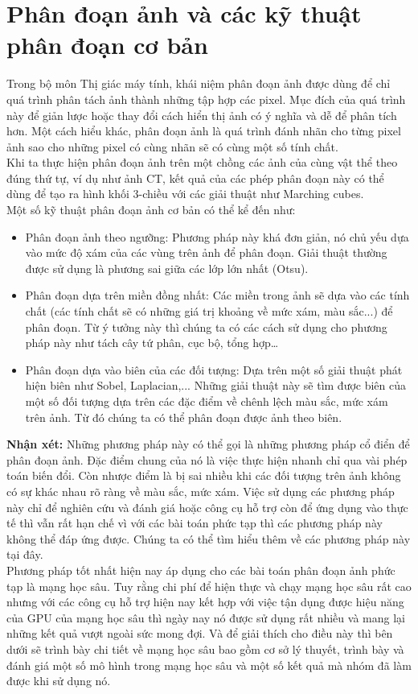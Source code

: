 \section{Phân đoạn ảnh và các kỹ thuật phân đoạn cơ bản}
Trong bộ môn Thị giác máy tính, khái niệm phân đoạn ảnh được dùng để chỉ quá trình phân tách ảnh thành những tập hợp các pixel. Mục đích của quá trình này để giản lược hoặc thay đổi cách hiển thị ảnh có ý nghĩa và dễ để phân tích hơn. Một cách hiểu khác, phân đoạn ảnh là quá trình đánh nhãn cho từng pixel ảnh sao cho những pixel có cùng nhãn sẽ có cùng một số tính chất.\\
Khi ta thực hiện phân đoạn ảnh trên một chồng các ảnh của cùng vật thể theo đúng thứ tự, ví dụ như ảnh CT, kết quả của các phép phân đoạn này có thể dùng để tạo ra hình khối 3-chiều với các giải thuật như Marching cubes.\\
Một số kỹ thuật phân đoạn ảnh cơ bản có thể kể đến như:
\begin{itemize}
\item Phân đoạn ảnh theo ngưỡng: Phương pháp này khá đơn giản, nó chủ yếu dựa vào mức độ xám của các vùng trên ảnh để phân đoạn. Giải thuật thường được sử dụng là phương sai giữa các lớp lớn nhất (Otsu).
\item Phân đoạn dựa trên miền đồng nhất: Các miền trong ảnh sẽ dựa vào các tính chất (các tính chất sẽ có những giá trị khoảng về mức xám, màu sắc...) để phân đoạn. Từ ý tưởng này thì chúng ta có các cách sử dụng cho phương pháp này như tách cây tứ phân, cục bộ, tổng hợp…
\item Phân đoạn dựa vào biên của các đối tượng: Dựa trên một số giải thuật phát hiện biên như Sobel, Laplacian,... Những giải thuật này sẽ tìm được biên của một số đối tượng dựa trên các đặc điểm về chênh lệch màu sắc, mức xám trên ảnh. Từ đó chúng ta có thể phân đoạn được ảnh theo biên.
\end{itemize}
\textbf{Nhận xét:} Những phương pháp này có thể gọi là những phương pháp cổ điển để phân đoạn ảnh. Đặc điểm chung của nó là việc thực hiện nhanh chỉ qua vài phép toán biến đổi. Còn nhược điểm là bị sai nhiều khi các đối tượng trên ảnh không có sự khác nhau rõ ràng về màu sắc, mức xám. Việc sử dụng các phương pháp này chỉ để nghiên cứu và đánh giá hoặc công cụ hỗ trợ còn để ứng dụng vào thực tế thì vẫn rất hạn chế vì với các bài toán phức tạp thì các phương pháp này không thể đáp ứng được. Chúng ta có thể tìm hiểu thêm về các phương pháp này tại đây\cite{segoverview}.\\
Phương pháp tốt nhất hiện nay áp dụng cho các bài toán phân đoạn ảnh phức tạp là mạng học sâu. Tuy rằng chi phí để hiện thực và chạy mạng học sâu rất cao nhưng với các công cụ hỗ trợ hiện nay kết hợp với việc tận dụng được hiệu năng của GPU của mạng học sâu thì ngày nay nó được sử dụng rất nhiều và mang lại những kết quả vượt ngoài sức mong đợi. Và để giải thích cho điều này thì bên dưới sẽ trình bày chi tiết về mạng học sâu bao gồm cơ sở lý thuyết, trình bày và đánh giá một số mô hình trong mạng học sâu và một số kết quả mà nhóm đã làm được khi sử dụng nó.

